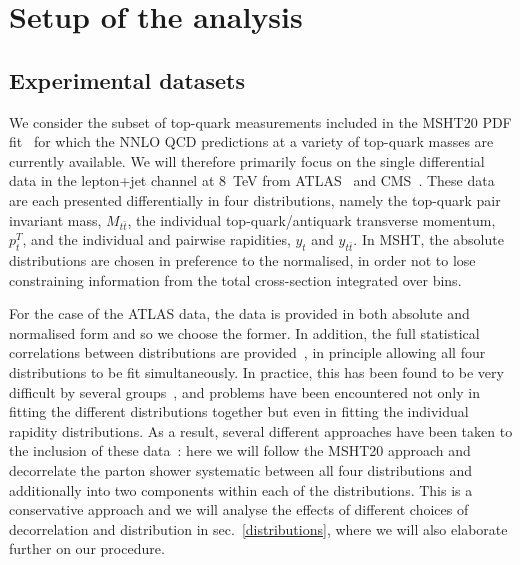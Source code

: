 \documentclass[sn-mathphys]{sn-jnl}%
\newcommand{\pT}{p^T_t}
\newcommand{\mtt}{M_{t\bar{t}}}
\newcommand{\yt}{y_{t}}
\newcommand{\ytt}{y_{t\bar{t}}}
\begin{document}
\section{Setup of the analysis}\label{setup}

\subsection{Experimental datasets} \label{data}
We consider the subset of top-quark measurements included in the MSHT20 PDF fit~\cite{Bailey:2020ooq} for which the NNLO QCD predictions at a variety of top-quark masses are currently available. We will therefore primarily focus on the single differential data in the lepton+jet channel at 8~TeV from ATLAS~\cite{ATLAS:2015lsn} and CMS~\cite{CMS:2015rld}. These data are each presented differentially in four distributions, namely the top-quark pair invariant mass, $\mtt$, the individual top-quark/antiquark transverse momentum, $\pT$, and the individual and pairwise rapidities, $\yt$ and $\ytt$. In MSHT, the absolute distributions are chosen in preference to the normalised, in order not to lose constraining information from the total cross-section integrated over bins.

For the case of the ATLAS data, the data is provided in both absolute and normalised form and so we choose the former. In addition, the full statistical correlations between distributions are provided~\cite{ATLAS:2015lsn,ATLAS:2018owm}, in principle allowing all four distributions to be fit simultaneously. In practice, this has been found to be very difficult by several groups~\cite{Czakon:2016olj,Bailey:2019yze,Thorne:2019mpt,Hou:2019efy,Amat:2019upj,Hou:2019gfw,Bailey:2020ooq,Kadir:2020yml,Amoroso:2020lgh,NNPDF:2021njg,Amoroso:2022eow}, and problems have been encountered not only in fitting the different distributions together but even in fitting the individual rapidity distributions. As a result, several different approaches have been taken to the inclusion of these data~\cite{Bailey:2019yze,Bailey:2020ooq,ATLAS:2018owm,Hou:2019efy,NNPDF:2021njg,Amoroso:2022eow}: here we will follow the MSHT20 approach and decorrelate the parton shower systematic between all four distributions and additionally into two components within each of the distributions. This is a conservative approach and we will analyse the effects of different choices of decorrelation and distribution in sec.~\ref{distributions}, where we will also elaborate further on our procedure. 
\end{document}
